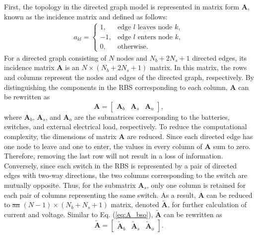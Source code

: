 \documentclass{article}
\providecommand{\DIFadd}[1]{{\protect\color{blue}\uwave{#1}}} %
\providecommand{\DIFdel}[1]{{\protect\color{red}\sout{#1}}}                      %
\providecommand{\DIFaddbegin}{} %
\providecommand{\DIFaddend}{} %
\providecommand{\DIFdelbegin}{} %
\providecommand{\DIFdelend}{} %
\newcommand{\DIFscaledelfig}{0.5}
\newlength{\DIFdelgraphicswidth} %
\newlength{\DIFdelgraphicsheight} %
\newcommand{\DIFaddincludegraphics}[2][]{{\color{blue}\fbox{\DIFOincludegraphics[#1]{#2}}}} %
\newcommand{\DIFdelincludegraphics}[2][]{%
\sbox{\DIFdelgraphicsbox}{\DIFOincludegraphics[#1]{#2}}%
\settoboxwidth{\DIFdelgraphicswidth}{\DIFdelgraphicsbox} %
\settoboxtotalheight{\DIFdelgraphicsheight}{\DIFdelgraphicsbox} %
\scalebox{\DIFscaledelfig}{%
\parbox[b]{\DIFdelgraphicswidth}{\usebox{\DIFdelgraphicsbox}\\[-\baselineskip] \rule{\DIFdelgraphicswidth}{0em}}\llap{\resizebox{\DIFdelgraphicswidth}{\DIFdelgraphicsheight}{%
\setlength{\unitlength}{\DIFdelgraphicswidth}%
\begin{picture}(1,1)%
\thicklines\linethickness{2pt} %
{\color[rgb]{1,0,0}\put(0,0){\framebox(1,1){}}}%
{\color[rgb]{1,0,0}\put(0,0){\line( 1,1){1}}}%
{\color[rgb]{1,0,0}\put(0,1){\line(1,-1){1}}}%
\end{picture}%
}\hspace*{3pt}}} %
} %
\DeclareRobustCommand{\DIFaddbegin}{\DIFOaddbegin \let\includegraphics\DIFaddincludegraphics} %
\DeclareRobustCommand{\DIFaddend}{\DIFOaddend \let\includegraphics\DIFOincludegraphics} %
\DeclareRobustCommand{\DIFdelbegin}{\DIFOdelbegin \let\includegraphics\DIFdelincludegraphics} %
\DeclareRobustCommand{\DIFdelend}{\DIFOaddend \let\includegraphics\DIFOincludegraphics} %
\begin{document}
First, the topology in the directed graph model is represented in matrix form $\bm{A}$, known as the incidence matrix and defined as follows:
\begin{align}\label{eq:A}
    a_{kl}=
    \begin{cases}
        1,  & \text{edge $l$ leaves node $k$},\\
        -1, & \text{edge $l$ enters node $k$},\\
        0,  & \text{otherwise}.
    \end{cases}
\end{align}
For a directed graph consisting of $N$ nodes and $N_b+2N_s+1$ directed edges, its incidence matrix $\bm{A}$ is an $N\times(N_b+2N_s+1)$ matrix. 
In this matrix, the rows and columns represent the nodes and edges of the directed graph, respectively.
By distinguishing the components in the RBS corresponding to each column, $\bm{A}$ can be rewritten as
\begin{equation}\label{eq:A_bso}
    \bm{A} =
    \begin{bmatrix}
        \bm{A}_b & \bm{A}_s & \bm{A}_o
    \end{bmatrix},
\end{equation}
where $\bm{A}_b$, $\bm{A}_s$, and $\bm{A}_o$ are the submatrices corresponding to the batteries, switches, and external electrical load, respectively.
To reduce the computational complexity, the dimensions of matrix $\bm{A}$ are reduced.
Since each directed edge has one node to leave and one to enter, the values in every column of $\bm{A}$ sum to zero.
Therefore, removing the last row will not result in a loss of information. 
Conversely, since each switch in the RBS is represented by a pair of directed edges with two-way directions, the two columns corresponding to the switch are mutually opposite.
Thus, for the submatrix $\bm{A}_s$, only one column is retained for each pair of columns representing the same switch.
As a result, $\bm{A}$ can be reduced to \DIFdelbegin \DIFdel{an }\DIFdelend \DIFaddbegin \DIFadd{a }\DIFaddend $(N-1)\times(N_b+N_s+1)$ matrix, denoted $\bm{\tilde{A}}$, for further calculation of current and voltage.
Similar to Eq. (\ref{eq:A_bso}), $\bm{\tilde{A}}$ can be rewritten as
\begin{equation}\label{eq:A_bso_tilde}
    \bm{\tilde{A}} =
    \begin{bmatrix}
        \bm{\tilde{A}}_b & \bm{\tilde{A}}_s & \bm{\tilde{A}}_o
    \end{bmatrix}.
\end{equation}
\end{document}

